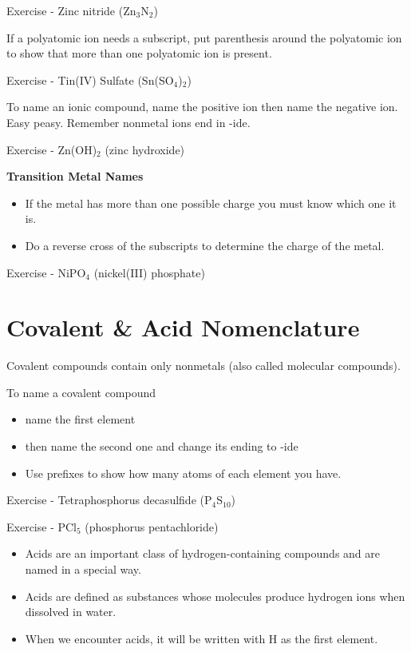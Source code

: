 \documentclass[../hchem.tex]{subfiles}
\begin{document}
Exercise - Zinc nitride (Zn$_3$N$_2$)

If a polyatomic ion needs a subscript, put parenthesis around the polyatomic ion to 
show that more than one polyatomic ion is present.

Exercise - Tin(IV) Sulfate (Sn(SO$_4$)$_2$)

To name an ionic compound, name the positive ion then name the negative ion. Easy peasy. Remember nonmetal ions end in -ide.

Exercise - Zn(OH)$_2$ (zinc hydroxide)

\textbf{Transition Metal Names}
\begin{itemize}
    \item If the metal has more than one possible charge you must know which one it is.
    \item Do a reverse cross of the subscripts to determine the charge of the metal.
\end{itemize}

Exercise - NiPO$_4$ (nickel(III) phosphate)
\section{Covalent \& Acid Nomenclature}
Covalent compounds contain only nonmetals (also called molecular compounds).

To name a covalent compound
\begin{itemize}
    \item name the first element 
    \item then name the second one and change its ending to -ide 
    \item Use prefixes to show how many atoms of each element you have.
\end{itemize}

Exercise - Tetraphosphorus decasulfide (P$_4$S$_{10}$)

Exercise - PCl$_5$ (phosphorus pentachloride)

\begin{itemize}
    \item Acids are an important class of hydrogen-containing compounds and are named in a special way.
    \item Acids are defined as substances whose molecules produce hydrogen ions when dissolved in water.
    \item When we encounter acids, it will be written with H as the first element.
\end{itemize}
\end{document}
